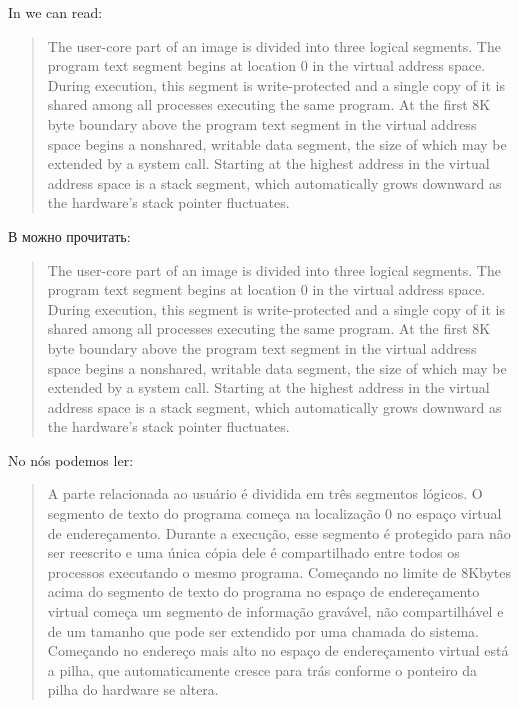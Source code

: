 \ifdefined\ENGLISH
In \cite{Ritchie74} we can read:

\begin{framed}
\begin{quotation}
The user-core part of an image is divided into three logical segments. The program text segment begins at location 0 in the virtual address space. During execution, this segment is write-protected and a single copy of it is shared among all processes executing the same program. At the first 8K byte boundary above the program text segment in the virtual address space begins a nonshared, writable data segment, the size of which may be extended by a system call. Starting at the highest address in the virtual address space is a stack segment, which automatically grows downward as the hardware's stack pointer fluctuates.
\end{quotation}
\end{framed}
\fi %

\ifdefined\RUSSIAN
В \cite{Ritchie74} можно прочитать:

\begin{framed}
\begin{quotation}
The user-core part of an image is divided into three logical segments. The program text segment begins at location 0 in the virtual address space. During execution, this segment is write-protected and a single copy of it is shared among all processes executing the same program. At the first 8K byte boundary above the program text segment in the virtual address space begins a nonshared, writable data segment, the size of which may be extended by a system call. Starting at the highest address in the virtual address space is a stack segment, which automatically grows downward as the hardware's stack pointer fluctuates.
\end{quotation}
\end{framed}
\fi %

\ifdefined\BRAZILIAN
No \cite{Ritchie74} nós podemos ler:

\begin{framed}
\begin{quotation}
A parte relacionada ao usuário é dividida em três segmentos lógicos. O segmento de texto do programa começa na localização 0 no espaço virtual de endereçamento.
Durante a execução, esse segmento é protegido para não ser reescrito e uma única cópia dele é compartilhado entre
todos os processos executando o mesmo programa.
Começando no limite de 8Kbytes acima do segmento de texto do programa no espaço de endereçamento virtual começa um segmento de informação gravável,
não compartilhável e de um tamanho que pode ser extendido por uma chamada do sistema.
Começando no endereço mais alto no espaço de endereçamento virtual está a pilha, que automaticamente cresce para trás conforme o ponteiro da pilha do hardware se altera.
\end{quotation}
\end{framed}
\fi %

